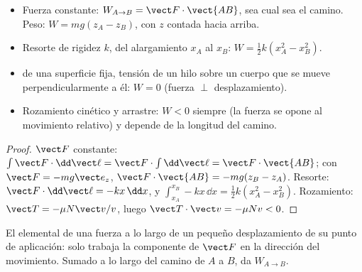\begin{proposition}\label{prop:b1:work-and-energy:works}
\begin{itemize}
  \item Fuerza constante: $W_{A\to B} = \vect F\cdot\vect{AB}$, sea cual
        sea el camino. Peso: $W = mg(z_A - z_B)$, con $z$ contada hacia arriba.
  \item Resorte de rigidez $k$, del alargamiento $x_A$ al $x_B$:
        $W = \tfrac12 k(x_A^2 - x_B^2)$.
  \item {} de una superficie fija, tensión de un hilo sobre
        un cuerpo que se mueve perpendicularmente a él: $W = 0$ (fuerza
        $\perp$ desplazamiento).
  \item Rozamiento cinético y arrastre: $W < 0$ siempre (la fuerza se
        opone al movimiento relativo) y depende de la longitud del camino.
\end{itemize}
\end{proposition}

\begin{proof}
$\vect F$ constante: $\int\vect F\cdot\dd\vect\ell = \vect F\cdot\int\dd\vect\ell
= \vect F\cdot\vect{AB}$; con $\vect F = -mg\vect e_z$, $\vect F\cdot\vect{AB}
= -mg(z_B - z_A)$. Resorte: $\vect F\cdot\dd\vect\ell = -kx\,\dd x$, y
$\int_{x_A}^{x_B}-kx\,\dd x = \tfrac12 k(x_A^2 - x_B^2)$. Rozamiento: $\vect T
= -\mu N\vect v/v$, luego $\vect T\cdot\vect v = -\mu Nv < 0$.
\end{proof}

\begin{omfigure}

{\small El  elemental de una fuerza a lo largo de un pequeño
desplazamiento de su punto de aplicación: solo trabaja la componente de
$\vect F$ en la dirección del movimiento. Sumado a lo largo del camino de
$A$ a $B$, da $W_{A\to B}$.}
\end{omfigure}

